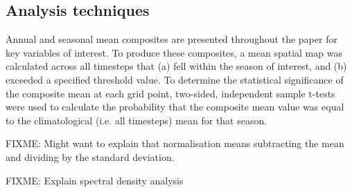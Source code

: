 \subsection{Analysis techniques}

Annual and seasonal mean composites are presented throughout the paper for key variables of interest. To produce these composites, a mean spatial map was calculated across all timesteps that (a) fell within the season of interest, and (b) exceeded a specified threshold value. To determine the statistical significance of the composite mean at each grid point, two-sided, independent sample t-tests were used to calculate the probability that the composite mean value was equal to the climatological (i.e. all timesteps) mean for that season.    

FIXME: Might want to explain that normalisation means subtracting the mean and dividing by the standard deviation.

FIXME: Explain spectral density analysis